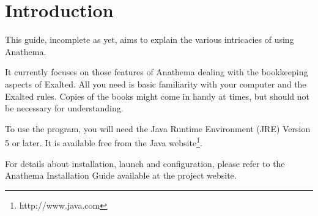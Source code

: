 \chapter{Introduction}
This guide, incomplete as yet, aims to explain the various intricacies of using Anathema.

It currently focuses on those features of Anathema dealing with the bookkeeping aspects of Exalted. All you need is basic familiarity with your computer and the Exalted rules. Copies of the books might come in handy at times, but should not be necessary for understanding.

To use the program, you will need the Java Runtime Environment (JRE) Version 5 or later. It is available free from the Java website\footnote{http://www.java.com}.

For details about installation, launch and configuration, please refer to the Anathema Installation Guide available at the project website.
